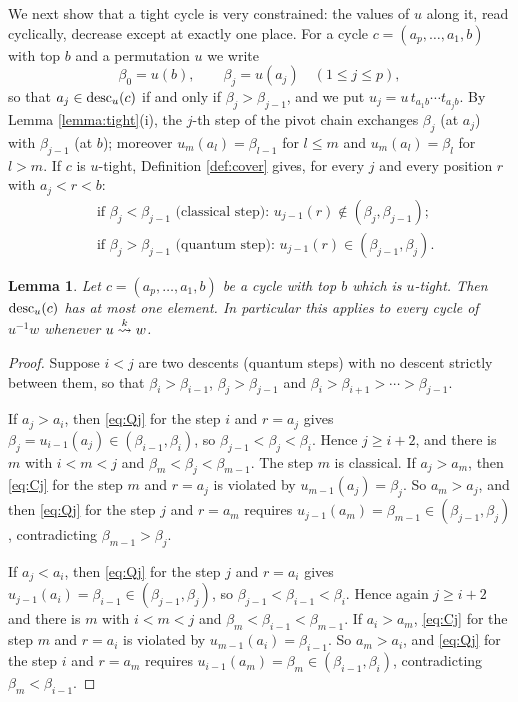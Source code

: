 \documentclass{amsart}
\newtheorem{lemma}{Lemma}[section]
\theoremstyle{definition}
\theoremstyle{remark}
\numberwithin{equation}{section}
\newcommand{\xrightsquigarrow}[2][]{%
	\mathrel{\mathop{\rightsquigarrow}\limits^{\scriptstyle #2}%
	\ifx\hfuzz#1\hfuzz\else_{\scriptstyle #1}\fi}%
}
\newcommand{\tom}[1]{\ensuremath{\xrightsquigarrow{#1}}}
\begin{document}
We next show that a tight cycle is very constrained: the values of $u$ along it, read cyclically, decrease except at exactly one place. For a cycle $c=(a_p,\ldots,a_1,b)$ with top $b$ and a permutation $u$ we write
$$\beta_0=u(b),\qquad \beta_j=u(a_j)\quad(1\leq j\leq p),$$
so that $a_j\in\mathrm{desc}_u(c)$ if and only if $\beta_j>\beta_{j-1}$, and we put $u_j=u\,t_{a_1b}\cdots t_{a_jb}$. By Lemma \ref{lemma:tight}(i), the $j$-th step of the pivot chain exchanges $\beta_j$ (at $a_j$) with $\beta_{j-1}$ (at $b$); moreover $u_m(a_l)=\beta_{l-1}$ for $l\leq m$ and $u_m(a_l)=\beta_l$ for $l>m$. If $c$ is $u$-tight, Definition \ref{def:cover} gives, for every $j$ and every position $r$ with $a_j<r<b$:
\begin{align}
&\text{if }\beta_j<\beta_{j-1}\text{ (classical step): } u_{j-1}(r)\notin(\beta_j,\beta_{j-1}); \label{eq:Cj}\\
&\text{if }\beta_j>\beta_{j-1}\text{ (quantum step): } u_{j-1}(r)\in(\beta_{j-1},\beta_j). \label{eq:Qj}
\end{align}

\begin{lemma} \label{lemma:onedescent}
Let $c=(a_p,\ldots,a_1,b)$ be a cycle with top $b$ which is $u$-tight. Then $\mathrm{desc}_u(c)$ has at most one element. In particular this applies to every cycle of $u^{-1}w$ whenever $u\tom{k}w$.
\end{lemma}
\begin{proof}
Suppose $i<j$ are two descents (quantum steps) with no descent strictly between them, so that $\beta_i>\beta_{i-1}$, $\beta_j>\beta_{j-1}$ and $\beta_i>\beta_{i+1}>\cdots>\beta_{j-1}$.

If $a_j>a_i$, then \eqref{eq:Qj} for the step $i$ and $r=a_j$ gives $\beta_j=u_{i-1}(a_j)\in(\beta_{i-1},\beta_i)$, so $\beta_{j-1}<\beta_j<\beta_i$. Hence $j\geq i+2$, and there is $m$ with $i<m<j$ and $\beta_m<\beta_j<\beta_{m-1}$. The step $m$ is classical. If $a_j>a_m$, then \eqref{eq:Cj} for the step $m$ and $r=a_j$ is violated by $u_{m-1}(a_j)=\beta_j$. So $a_m>a_j$, and then \eqref{eq:Qj} for the step $j$ and $r=a_m$ requires $u_{j-1}(a_m)=\beta_{m-1}\in(\beta_{j-1},\beta_j)$, contradicting $\beta_{m-1}>\beta_j$.

If $a_j<a_i$, then \eqref{eq:Qj} for the step $j$ and $r=a_i$ gives $u_{j-1}(a_i)=\beta_{i-1}\in(\beta_{j-1},\beta_j)$, so $\beta_{j-1}<\beta_{i-1}<\beta_i$. Hence again $j\geq i+2$ and there is $m$ with $i<m<j$ and $\beta_m<\beta_{i-1}<\beta_{m-1}$. If $a_i>a_m$, \eqref{eq:Cj} for the step $m$ and $r=a_i$ is violated by $u_{m-1}(a_i)=\beta_{i-1}$. So $a_m>a_i$, and \eqref{eq:Qj} for the step $i$ and $r=a_m$ requires $u_{i-1}(a_m)=\beta_m\in(\beta_{i-1},\beta_i)$, contradicting $\beta_m<\beta_{i-1}$.
\end{proof}
\end{document}
